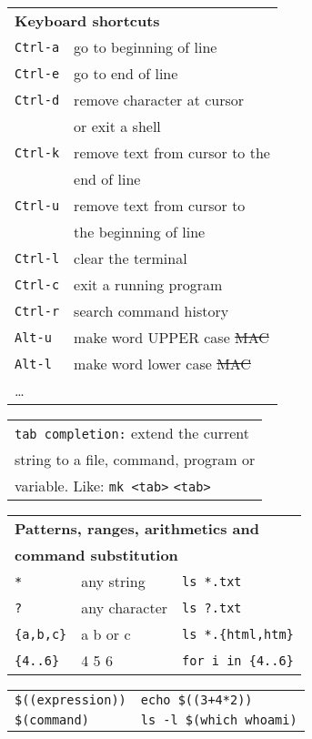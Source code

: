\documentclass[a4paper,10pt,landscape]{report}
\newcommand{\boxtitle}[1]{{\textbf{\color{RubineRed}#1}}}
\newcommand{\example}[1]{{\texttt{\color{RubineRed}#1}}}
\newcommand{\labbr}[1]{{\texttt{\color{Red}#1}}}
\newcommand{\rabbr}[1]{{\color{Red}#1}}
\newcommand{\co}[1]{\texttt{#1}}
\begin{document}
\begin{multicols}{4}
\begin{mdframed}[style=mybox2]
\begin{tabular}{ l l }
\multicolumn{2}{l}{\boxtitle{Keyboard shortcuts}} \\
\labbr{Ctrl-a}  &  go to beginning of line \\
\labbr{Ctrl-e}  &  go to end of line \\
\labbr{Ctrl-d}  &  remove character at cursor \\ 
             &  or exit a shell \\
\labbr{Ctrl-k}  &  remove text from cursor to the \\
             &  end of line \\
\labbr{Ctrl-u}  &  remove text from cursor to \\
             &  the beginning of line \\ 
\labbr{Ctrl-l}  &  clear the terminal \\
\labbr{Ctrl-c}  &  exit a running program \\
\labbr{Ctrl-r}  &  search command history \\
\labbr{Alt-u}   &  make word UPPER case \rabbr{\sout{MAC}} \\
\labbr{Alt-l}   &  make word lower case \rabbr{\sout{MAC}} \\
\ldots{}      & \\
\end{tabular}
\begin{tabular}{ l }
\labbr{tab completion:} {extend the current} \\
{string to a file, command, program or} \\
{variable. Like:} 
\co{mk }\labbr{\textless{}tab\textgreater{}} \labbr{\textless{}tab\textgreater{}} \\
\end{tabular}
\end{mdframed}

\begin{mdframed}[style=mybox2]
\begin{tabular}{ l l l }
\multicolumn{3}{l}{\boxtitle{Patterns, ranges, arithmetics and}} \\
\multicolumn{3}{l}{\boxtitle{command substitution}} \\
\labbr{*}        & any string     & \example{ls *.txt} \\
\labbr{?}        & any character  & \example{ls ?.txt} \\
\labbr{\{a,b,c\}}& a b or c       & \example{ls *.\{html,htm\}} \\
\labbr{\{4..6\}} & 4 5 6          & \example{for i in \{4..6\}} \\
\end{tabular}
\begin{tabular}{ l l }
\labbr{\$((expression))}   & \example{echo \$((3+4*2))} \\
\labbr{\$(command)}        & \example{ls -l \$(which whoami)} \\
\end{tabular}
\end{mdframed}


\end{multicols}
\end{document}
